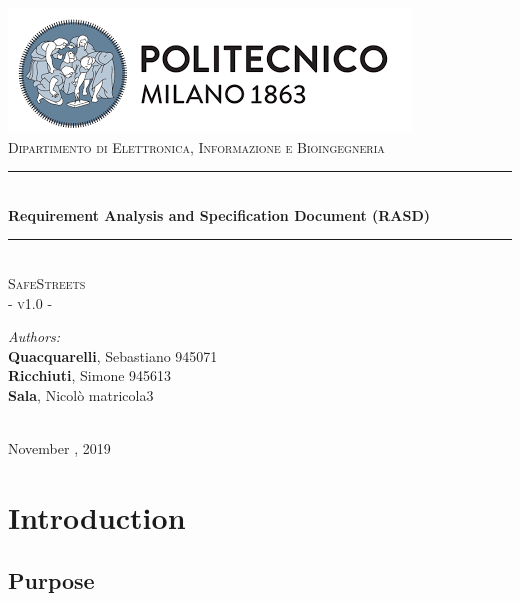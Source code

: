 \documentclass{article}
\begin{document}
	\begin{titlepage}
		
		\centering
		\vspace*{0.7 cm}
		\includegraphics[scale = 0.7]{images/PolimiLogo.png}\\[1 cm]
		\textsc{\large Dipartimento di Elettronica, Informazione e Bioingegneria}\\[2 cm]
		
		\rule{\linewidth}{0.2 mm} \\[0.5 cm]
		{\huge \bfseries Requirement Analysis and Specification Document (RASD)}\\
		\rule{\linewidth}{0.2 mm} \\[1.5 cm]
		
		\textsc{\Large SafeStreets}\\[0.5 cm]
		\textsc{\large - v1.0 -}\\[1 cm]
		
		\begin{minipage}{\textwidth}
			\begin{flushleft} \large
				\emph{Authors:}\\
				\textbf{Quacquarelli}, Sebastiano \hfill 945071 \\
				\textbf{Ricchiuti}, Simone \hfill 945613  \\
				\textbf{Sala}, Nicolò \hfill matricola3 \\[2 cm]
			\end{flushleft}
		\end{minipage}\\[2 cm]
		
		{\large November  , 2019}\\[2 cm]
		
	\end{titlepage}
	
	\tableofcontents
	
	\newpage
	\setcounter{page}{1}
	
	\section{Introduction}
		\subsection{Purpose}
		
\end{document}
